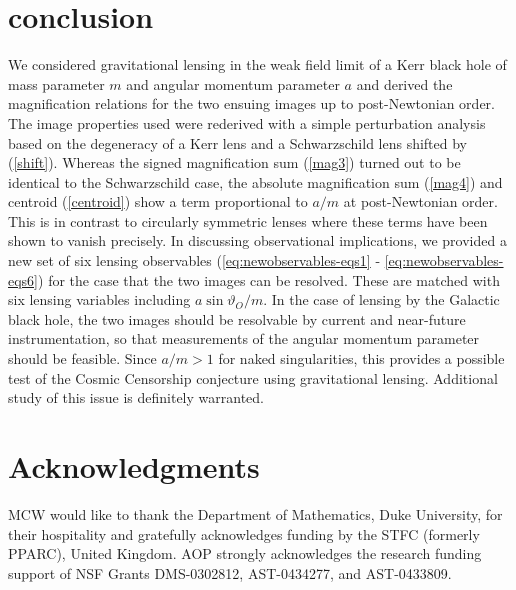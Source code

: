 \documentclass[prd,12pt,a4paper,showpacs]{revtex4}
\begin{document}
\section{conclusion}

We considered gravitational lensing in the weak field limit of a 
Kerr black hole of mass parameter $m$ and angular momentum parameter $a$ and derived the 
magnification relations for the two ensuing images up to post-Newtonian order. 
The image properties used were rederived with a simple perturbation analysis 
based on the degeneracy of a Kerr lens and a Schwarzschild lens shifted 
by (\ref{shift}). Whereas the signed magnification sum (\ref{mag3}) 
turned out to be identical to the Schwarzschild case, 
the absolute magnification sum (\ref{mag4}) and centroid (\ref{centroid})
show a term proportional to $a/m$ at post-Newtonian order. 
This is in contrast to circularly symmetric lenses where these terms have 
been shown to vanish precisely. In discussing observational implications, 
we provided a new set of six lensing observables 
(\ref{eq:newobservables-eqs1} - \ref{eq:newobservables-eqs6}) 
for the case that the two images can be resolved. These are matched with
six lensing variables including $a\sin\vartheta_O/m$. 
In the case of lensing by the Galactic black hole, 
the two images should be resolvable by current and near-future instrumentation, 
so that measurements of the angular momentum parameter should be feasible. 
Since $a/m>1$ for naked singularities, 
this provides a possible test of the Cosmic Censorship conjecture using 
gravitational lensing. Additional study of this issue is definitely warranted.

\section*{Acknowledgments}
MCW would like to thank the Department of Mathematics, Duke University, for their hospitality and gratefully acknowledges funding by the STFC (formerly PPARC), United Kingdom.
AOP strongly acknowledges the research funding support of NSF Grants
DMS-0302812, AST-0434277, and AST-0433809.
\end{document}
